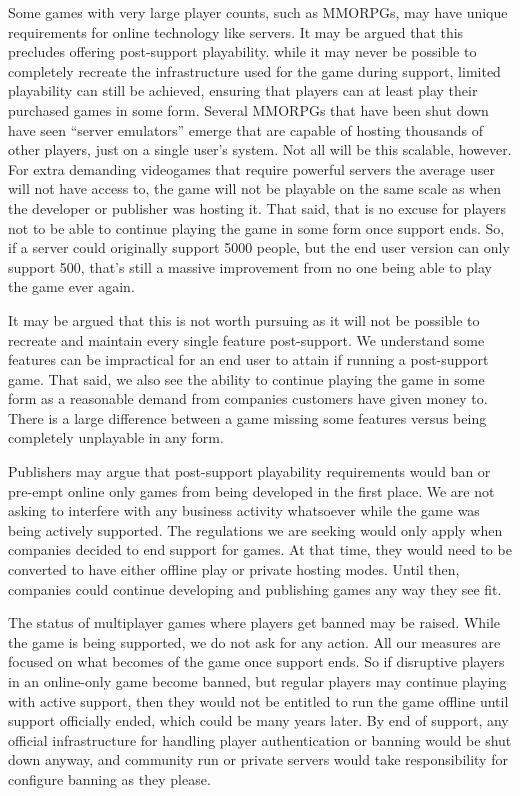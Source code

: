Some games with very large player counts, such as MMORPGs, may have unique requirements for online technology like servers.
It may be argued that this precludes offering post-support playability.
while it may never be possible to completely recreate the infrastructure used for the game during support,
limited playability can still be achieved, ensuring that players can at least play their purchased games in some form.
Several MMORPGs that have been shut down have seen ``server emulators'' emerge that are capable of hosting thousands of other players, just on a single user's system\cn.
Not all will be this scalable, however.
For extra demanding videogames that require powerful servers the average user will not have access to,
the game will not be playable on the same scale as when the developer or publisher was hosting it.
That said, that is no excuse for players not to be able to continue playing the game in some form once support ends.
So, if a server could originally support 5000 people, but the end user version can only support 500,
that's still a massive improvement from no one being able to play the game ever again.

It may be argued that this is not worth pursuing as it will not be possible to recreate and maintain every single feature post-support.
We understand some features can be impractical for an end user to attain if running a post-support game.%
That said, we also see the ability to continue playing the game in some form as a reasonable demand from companies customers have given money to.
There is a large difference between a game missing some features versus being completely unplayable in any form.

Publishers may argue that post-support playability requirements would ban or pre-empt online only games from being developed in the first place.
We are not asking to interfere with any business activity whatsoever while the game was being actively supported.
The regulations we are seeking would only apply when companies decided to end support for games.
At that time, they would need to be converted to have either offline play or private hosting modes.
Until then, companies could continue developing and publishing games any way they see fit.

The status of multiplayer games where players get banned may be raised.
While the game is being supported, we do not ask for any action.
All our measures are focused on what becomes of the game once support ends.
So if disruptive players in an online-only game become banned, but regular players may continue playing with active support,
then they would not be entitled to run the game offline until support officially ended, which could be many years later\cn.
By end of support, any official infrastructure for handling player authentication or banning would be shut down anyway,
and community run or private servers would take responsibility for configure banning as they please.


